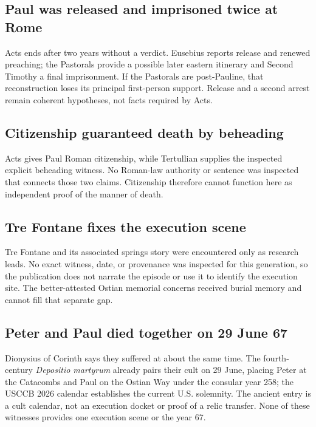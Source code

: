 \subsection{Paul was released and imprisoned twice at Rome}

Acts ends after two years without a verdict. Eusebius reports release and
renewed preaching; the Pastorals provide a possible later eastern itinerary and
Second Timothy a final imprisonment. If the Pastorals are post-Pauline, that
reconstruction loses its principal first-person support. Release and a second
arrest remain coherent hypotheses, not facts required by Acts.

\subsection{Citizenship guaranteed death by beheading}

Acts gives Paul Roman citizenship, while Tertullian supplies the inspected
explicit beheading witness. No Roman-law authority or sentence was inspected
that connects those two claims. Citizenship therefore cannot function here as
independent proof of the manner of death.

\subsection{Tre Fontane fixes the execution scene}

Tre Fontane and its associated springs story were encountered only as research
leads. No exact witness, date, or provenance was inspected for this generation,
so the publication does not narrate the episode or use it to identify the
execution site. The better-attested Ostian memorial concerns received burial
memory and cannot fill that separate gap.

\subsection{Peter and Paul died together on 29 June 67}

Dionysius of Corinth says they suffered at about the same time. The
fourth-century \emph{Depositio martyrum} already pairs their cult on 29 June,
placing Peter at the Catacombs and Paul on the Ostian Way under the consular
year 258; the USCCB 2026 calendar establishes the current U.S. solemnity. The
ancient entry is a cult calendar, not an execution docket or proof of a relic
transfer. None of these witnesses provides one execution scene or the year 67.

